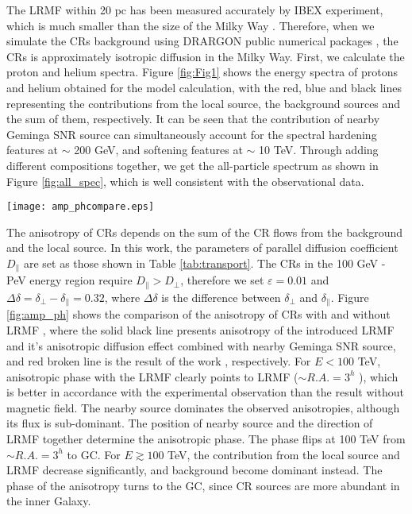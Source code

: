 \documentclass[a4paper,11pt]{article}
\begin{document}
The LRMF within 20 pc has been measured accurately by IBEX experiment, which is much smaller than the size of the Milky Way \citep {2013ApJ...776...30F, 2017JCAP...10..019C}.
Therefore, when we simulate the CRs background using DRARGON public numerical packages \citep {2008AIPC.1085..380E}, the CRs  is approximately isotropic diffusion in the Milky Way. 
First, we calculate the proton and helium spectra. Figure \ref{fig:Fig1} shows the energy spectra of protons and helium obtained for the model calculation, with the red, blue and black lines representing the contributions from the local source, the background sources and the sum of them, respectively. It can be seen that the contribution of nearby Geminga SNR source can simultaneously account for the spectral hardening features at $\sim$ 200 GeV, and softening features at  $\sim$ 10 TeV. 
Through adding different compositions together, we  get the all-particle spectrum as shown in  Figure \ref{fig:all_spec}, which is well consistent with the observational data.
\begin{figure*}
	\texttt{[image: amp\_phcompare.eps]}
	\caption{When $\varepsilon=0.01$, $\Delta\delta=0.32$, energy dependences of the amplitude (left) and phase (right)	of the dipole anisotropies together with the contribution from nearby Geminga SNR source and LRMF. 
		The red broken line indicates the result \citep{2019JCAP...10..010L}.
	}
	\label{fig:amp_ph}
\end{figure*}

The anisotropy of CRs depends on the sum of the CR flows from the background  and the local source. %
In this work, the parameters of parallel diffusion coefficient $D_\parallel$ are set as those shown in Table \ref{tab:transport}.
The CRs in the 100 GeV - PeV energy region require $D_\parallel> D_\perp$, therefore
we  set $\varepsilon=0.01$ and  $\Delta\delta=\delta_\perp-\delta_\parallel=0.32$, where $\Delta\delta$ is the difference between  $\delta_\perp$ and $\delta_\parallel$. 
Figure  \ref{fig:amp_ph} shows the comparison of the anisotropy of CRs with and without LRMF \citep{2019JCAP...10..010L},
where the solid black line presents anisotropy of the introduced LRMF and it's anisotropic diffusion effect combined with   nearby Geminga SNR source, and red broken line is  the result of the work \citep{2019JCAP...10..010L}, respectively. 
For $E<100$ TeV,  anisotropic phase with the LRMF clearly points to LRMF ($\sim R.A.= 3^h$ ), which is better in accordance with the experimental observation than the result without magnetic field. The nearby source dominates the observed anisotropies, although its flux is sub-dominant. The position of nearby source and the direction of LRMF together determine the anisotropic phase.  The phase flips at 100 TeV from  $\sim R.A.= 3^h$ to GC. For $E\gtrsim100$ TeV, the contribution from the local source and LRMF decrease significantly, and background become dominant instead. The phase of the anisotropy turns to the  GC, since CR sources are more abundant in the inner Galaxy.
\end{document}
